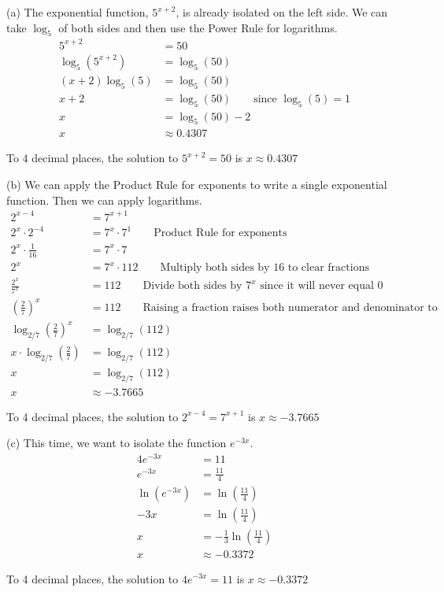 \begin{solution} \bigskip 
(a) The exponential function, $5^{x+2}$, is already isolated on the left side. We can take $\log_5$ of both sides and then use the Power Rule for logarithms. 
\begin{align*}
	5^{x+2} &= 50 \\
	\log_5\left(5^{x+2}\right) &= \log_5(50) \\
	(x+2)\log_5(5) &= \log_5(50) \\
	x+2 &= \log_5(50) \qquad \text{since $\log_5(5) = 1$} \\
	x &= \log_5(50) - 2 \\
	x &\approx 0.4307
\end{align*}

To 4 decimal places, the solution to $5^{x+2} = 50$ is $\boxed{x \approx 0.4307}$ \newline 

(b) We can apply the Product Rule for exponents to write a single exponential function. Then we can apply logarithms.
\begin{align*}
	2^{x-4} &= 7^{x+1}		\\
	2^x \cdot 2^{-4} &= 7^x \cdot 7^1 \qquad \text{Product Rule for exponents} \\
	2^x \cdot \tfrac{1}{16} &= 7^x \cdot 7 \\
	2^x &= 7^x \cdot 112 \qquad \text{Multiply both sides by 16 to clear fractions} \\
	\tfrac{2^x}{7^x} &= 112	\qquad \text{Divide both sides by $7^x$ since it will never equal 0} \\
	\left(\tfrac{2}{7}\right)^x &= 112	\qquad \text{Raising a fraction raises both numerator and denominator to that power} \\
	\log_{2/7}\left(\tfrac{2}{7}\right)^x &= \log_{2/7}(112) \\
	x \cdot \log_{2/7}\left(\tfrac{2}{7}\right) &= \log_{2/7}(112) \\
	x &= \log_{2/7}(112) \\
	x &\approx -3.7665
\end{align*}

To 4 decimal places, the solution to $2^{x-4} = 7^{x+1}$ is $\boxed{x \approx -3.7665}$ \newline 

(c) This time, we want to isolate the function $e^{-3x}$.
\begin{align*}
	4e^{-3x} &= 11 \\
	e^{-3x} &= \tfrac{11}{4} \\
	\ln\left(e^{-3x}\right) &= \ln\left(\tfrac{11}{4}\right) \\
	-3x &= \ln\left(\tfrac{11}{4}\right) \\
	x &= -\tfrac{1}{3} \ln\left(\tfrac{11}{4}\right) \\
	x &\approx -0.3372
\end{align*}

To 4 decimal places, the solution to $4e^{-3x} = 11$ is $\boxed{x \approx -0.3372}$
\end{solution}

